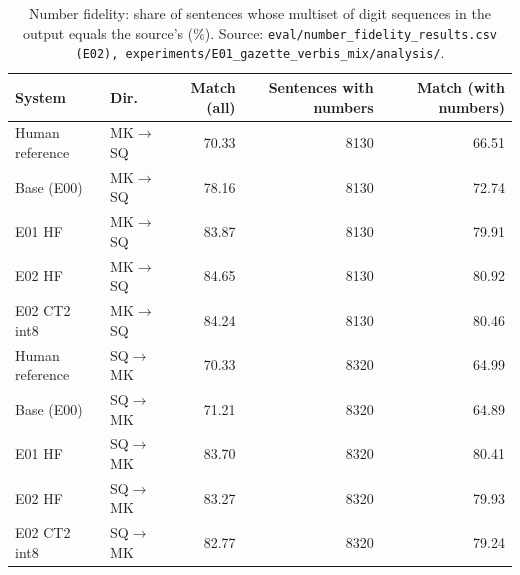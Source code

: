 \begin{table}[t]
\centering
\small
\begin{tabular}{llrrr}
\toprule
System & Dir. & Match (all) & Sentences with numbers & Match (with numbers) \\
\midrule
Human reference & MK$\rightarrow$SQ & 70.33 & 8130 & 66.51 \\
Base (E00) & MK$\rightarrow$SQ & 78.16 & 8130 & 72.74 \\
E01 HF & MK$\rightarrow$SQ & 83.87 & 8130 & 79.91 \\
E02 HF & MK$\rightarrow$SQ & 84.65 & 8130 & 80.92 \\
E02 CT2 int8 & MK$\rightarrow$SQ & 84.24 & 8130 & 80.46 \\
Human reference & SQ$\rightarrow$MK & 70.33 & 8320 & 64.99 \\
Base (E00) & SQ$\rightarrow$MK & 71.21 & 8320 & 64.89 \\
E01 HF & SQ$\rightarrow$MK & 83.70 & 8320 & 80.41 \\
E02 HF & SQ$\rightarrow$MK & 83.27 & 8320 & 79.93 \\
E02 CT2 int8 & SQ$\rightarrow$MK & 82.77 & 8320 & 79.24 \\
\bottomrule
\end{tabular}
\caption{Number fidelity: share of sentences whose multiset of digit sequences in the output equals the source's (\%). Source: \texttt{eval/number\_fidelity\_results.csv (E02), experiments/E01\_gazette\_verbis\_mix/analysis/}.}
\label{tab:e02-number-fidelity}
\end{table}
